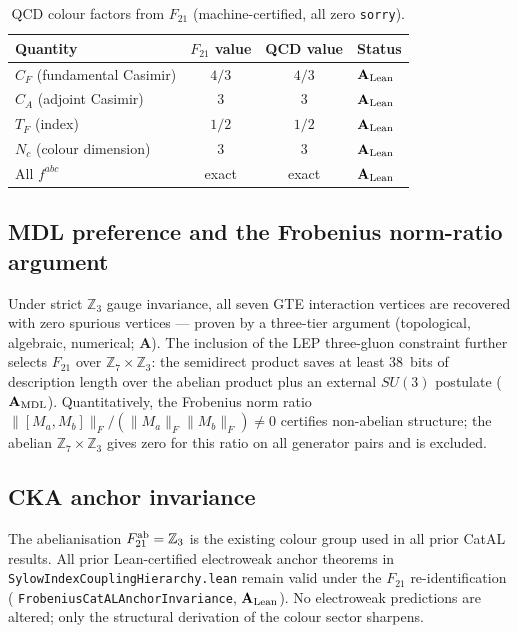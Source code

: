 \documentclass[11pt]{article}
\theoremstyle{remark}
\newcommand{\ZS}{\mathbb{Z}_7}
\newcommand{\ZZ}{\mathbb{Z}}
\newcommand{\Ftwentyone}{F_{21}}
\newcommand{\lean}[1]{%
  \penalty-100
  \begingroup\def\_{\textunderscore\allowbreak}\texttt{#1}\endgroup}
\newcommand{\CatA}{\textbf{A}}
\newcommand{\CatAL}{\ensuremath{\textbf{A}_{\rm Lean}}}
\newcommand{\CatAMDL}{\ensuremath{\textbf{A}_{\rm MDL}}}
\begin{document}
\begin{table}[ht]
\centering
\caption{QCD colour factors from $\Ftwentyone$ (machine-certified, all zero
  \texttt{sorry}).}
\label{tab:casimir}
\begin{tabular}{lccl}
\toprule
Quantity & $\Ftwentyone$ value & QCD value & Status \\
\midrule
$C_F$ (fundamental Casimir) & $4/3$ & $4/3$ & \CatAL{} \\
$C_A$ (adjoint Casimir) & $3$ & $3$ & \CatAL{} \\
$T_F$ (index) & $1/2$ & $1/2$ & \CatAL{} \\
$N_c$ (colour dimension) & $3$ & $3$ & \CatAL{} \\
All $f^{abc}$ & exact & exact & \CatAL{} \\
\bottomrule
\end{tabular}
\end{table}

\subsection{MDL preference and the Frobenius norm-ratio argument}
\label{ssec:mdlpref}

Under strict $\ZZ_3$ gauge invariance, all seven GTE interaction vertices are
recovered with zero spurious vertices --- proven by a three-tier argument
(topological, algebraic, numerical; \CatA{}).
The inclusion of the LEP three-gluon constraint further selects $\Ftwentyone$
over $\ZS \times \ZZ_3$: the semidirect product saves at least 38~bits of
description length over the abelian product plus an external $SU(3)$ postulate
(\CatAMDL{}).
Quantitatively, the Frobenius norm ratio
$\|[M_{a},M_{b}]\|_F / (\|M_a\|_F \|M_b\|_F) \neq 0$
certifies non-abelian structure; the abelian $\ZS \times \ZZ_3$ gives zero
for this ratio on all generator pairs and is excluded.

\subsection{CKA anchor invariance}
\label{ssec:cka}

The abelianisation $\Ftwentyone^{\rm ab} = \ZZ_3$ is the existing colour group
used in all prior CatAL results.
All prior Lean-certified electroweak anchor theorems in
\lean{SylowIndexCouplingHierarchy.lean} remain valid under the $\Ftwentyone$
re-identification (\lean{FrobeniusCatALAnchorInvariance}, \CatAL{}).
No electroweak predictions are altered; only the structural derivation of the
colour sector sharpens.
\end{document}
